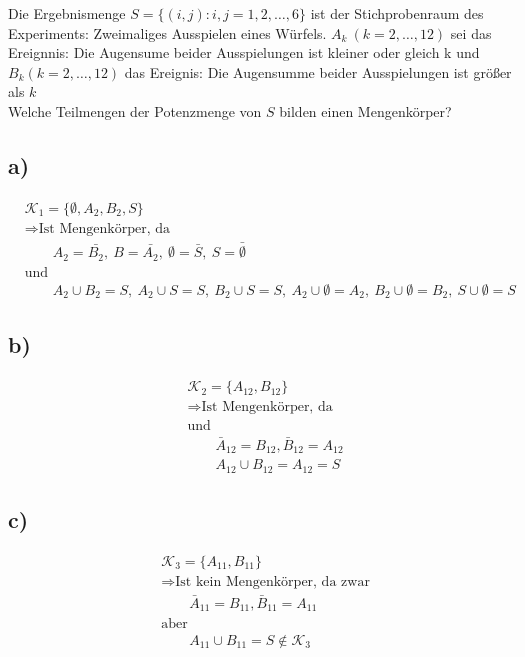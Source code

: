\documentclass{article}
\begin{document}
Die Ergebnismenge $S = \{(i,j) : i, j = 1,2, \ldots, 6\}$ ist der Stichprobenraum des Experiments: Zweimaliges Ausspielen eines Würfels. $A_{k} ~ (k= 2, \ldots, 12)$ sei das Ereignnis: Die Augensume beider Ausspielungen ist kleiner oder gleich k und $B_{k}(k = 2, \ldots, 12)$ das Ereignis: Die Augensumme beider Ausspielungen ist größer als $k$ 
\\
Welche Teilmengen der Potenzmenge von $S$ bilden einen Mengenkörper?

\subsection*{a)}
\begin{align*}
    &\mathcal{K}_{1} = \{\emptyset, A_{2}, B_{2}, S\} \\
    &\Rightarrow \text{Ist Mengenkörper, da } \\
    & \qquad A_{2} = \bar{B_{2}},~  B = \bar{A_{2}},~ \emptyset = \bar{S},~ S = \bar{\emptyset}\\
    &\text{und} \\
    & \qquad A_{2} \cup B_{2} = S,~ A_{2} \cup S = S,~ B_{2} \cup S = S,~ A_{2} \cup \emptyset = A_{2},~ B_{2} \cup \emptyset = B_{2},~ S \cup \emptyset = S
\end{align*}
\subsection*{b)}
\begin{align*}
    &\mathcal{K}_{2} = \{A_{12}, B_{12}\} \\
    &\Rightarrow \text{Ist Mengenkörper, da } \\
    &\text{und} \\
    & \qquad \bar{A}_{12} = B_{12}, \bar{B}_{12} = A_{12}\\
    &\qquad A_{12} \cup B_{12} = A_{12} = S
\end{align*}
\subsection*{c)}
\begin{align*}
    &\mathcal{K}_{3} = \{A_{11}, B_{11}\} \\
    &\Rightarrow \text{Ist kein Mengenkörper, da  zwar} \\
    & \qquad \bar{A}_{11} = B_{11}, \bar{B}_{11} = A_{11}\\
    &\text{aber} \\
    &\qquad A_{11} \cup B_{11} = S \notin \mathcal{K}_{3}
\end{align*}
\end{document}
